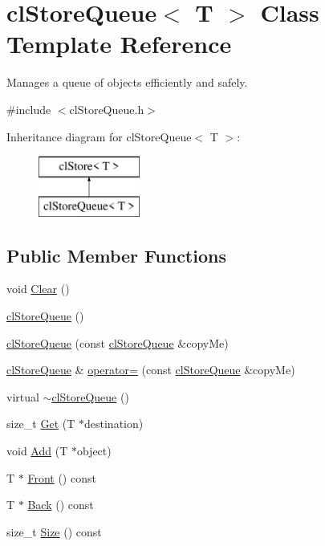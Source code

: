 \hypertarget{classcl_store_queue}{
\section{clStoreQueue$<$ T $>$ Class Template Reference}
\label{classcl_store_queue}
}


Manages a queue of objects efficiently and safely.  




{\ttfamily \#include $<$clStoreQueue.h$>$}

Inheritance diagram for clStoreQueue$<$ T $>$:\begin{figure}[H]
\begin{center}
\leavevmode
\includegraphics[height=2.000000cm]{classcl_store_queue}
\end{center}
\end{figure}
\subsection*{Public Member Functions}
\begin{DoxyCompactItemize}
\item 
void \hyperlink{classcl_store_queue_a194546aad6707beb89aecd424f21faed}{Clear} ()
\item 
\hyperlink{classcl_store_queue_a922cc3100b5269c57651e393987add85}{clStoreQueue} ()
\item 
\hyperlink{classcl_store_queue_aa7138be3a829a204d5ea0514ac28f6d9}{clStoreQueue} (const \hyperlink{classcl_store_queue}{clStoreQueue} \&copyMe)
\item 
\hyperlink{classcl_store_queue}{clStoreQueue} \& \hyperlink{classcl_store_queue_a8dfa2ee5eaf2ccab95d1ea1f113143d9}{operator=} (const \hyperlink{classcl_store_queue}{clStoreQueue} \&copyMe)
\item 
virtual \hyperlink{classcl_store_queue_a21554f043c66280035122de70695b708}{$\sim$clStoreQueue} ()
\item 
size\_\-t \hyperlink{classcl_store_queue_ac15b3716f7733992f81709b7ddfe6b71}{Get} (T $\ast$destination)
\item 
void \hyperlink{classcl_store_queue_a7851576e24ca060b529604e92fee2020}{Add} (T $\ast$object)
\item 
T $\ast$ \hyperlink{classcl_store_queue_a0e2ecd0a5aa2e3b5b9e4292520ae1352}{Front} () const 
\item 
T $\ast$ \hyperlink{classcl_store_queue_ae6897623e153bcb50f46fd12fa734cad}{Back} () const 
\item 
size\_\-t \hyperlink{classcl_store_queue_a22c0e035f508f164ce52768b9799f1c8}{Size} () const 
\end{DoxyCompactItemize}
